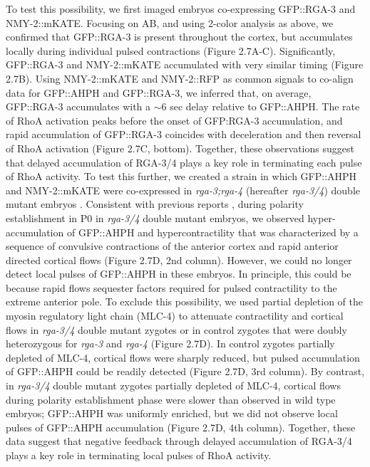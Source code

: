 \documentclass{ucetd}
\begin{document}
To test this possibility, we first imaged embryos co-expressing GFP::RGA-3 and NMY-2::mKATE. Focusing on AB, and using 2-color analysis as above, we confirmed that GFP::RGA-3 is present throughout the cortex, but accumulates locally during individual pulsed contractions (Figure 2.7A-C). Significantly, GFP::RGA-3 and NMY-2::mKATE accumulated with very similar timing (Figure 2.7B). Using NMY-2::mKATE and NMY-2::RFP  as common signals to co-align data for GFP::AHPH and GFP::RGA-3, we inferred that, on average, GFP::RGA-3 accumulates with a $\sim$6 sec delay relative to GFP::AHPH. The rate of RhoA activation peaks before the onset of GFP:RGA-3 accumulation, and rapid accumulation of GFP::RGA-3 coincides with deceleration and then reversal of RhoA activation (Figure 2.7C, bottom). Together, these observations suggest that delayed accumulation of RGA-3/4 plays a key role in terminating each pulse of RhoA activity. To test this further, we created a strain in which GFP::AHPH and NMY-2::mKATE were co-expressed in \textit{rga-3;rga-4} (hereafter \textit{rga-3/4}) double mutant embryos \cite{Zanin:2013el}. Consistent with previous reports \cite{Schonegg:2007if, Zanin:2013el, Schmutz:2007jq, Tse:2012fp}, during polarity establishment in P0 in \textit{rga-3/4} double mutant embryos, we observed hyper-accumulation of GFP::AHPH and hypercontractility that was characterized by a sequence of convulsive contractions of the anterior cortex and rapid anterior directed cortical flows (Figure 2.7D, 2nd column).  However, we could no longer detect local pulses of GFP::AHPH in these embryos.  In principle, this could be because rapid flows sequester factors required for pulsed contractility to the extreme anterior pole. To exclude this possibility, we used partial depletion of the myosin regulatory light chain (MLC-4) to attenuate contractility and cortical flows in \textit{rga-3/4} double mutant zygotes or in control zygotes that were doubly heterozygous for \textit{rga-3} and \textit{rga-4} (Figure 2.7D).  In control zygotes partially depleted of MLC-4, cortical flows were sharply reduced, but pulsed accumulation of GFP::AHPH could be readily detected (Figure 2.7D, 3rd column). By contrast, in \textit{rga-3/4} double mutant zygotes partially depleted of MLC-4, cortical flows during polarity establishment phase were slower than observed in wild type embryos; GFP::AHPH was uniformly enriched, but we did not observe local pulses of GFP::AHPH accumulation (Figure 2.7D, 4th column).  Together, these data suggest that negative feedback through delayed accumulation of RGA-3/4 plays a key role in terminating local pulses of RhoA activity.
\end{document}
